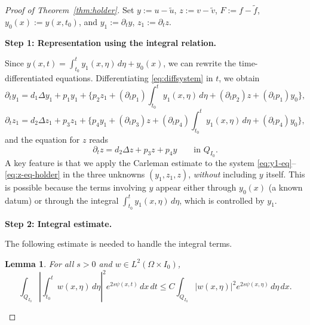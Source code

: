 \documentclass[12pt]{amsart}
\theoremstyle{plain}
\newtheorem{lemma}{Lemma}[section]
\theoremstyle{definition}
\theoremstyle{remark}
\newcommand{\p}{\partial}
\newcommand{\Om}{\Omega}
\newcommand{\Lap}{\Delta}
\begin{document}
\begin{proof}[Proof of Theorem~\ref{thm:holder}]
Set $y:=u-\widetilde u$, $z:=v-\widetilde v$, $F:=f-\widetilde f$,
$y_0(x):=y(x,t_0)$, and $y_1:=\p_t y$, $z_1:=\p_t z$.

\medskip
\noindent\textbf{Step 1: Representation using the integral relation.}

Since $y(x,t)=\int_{t_0}^t y_1(x,\eta)\,d\eta+y_0(x)$, we can rewrite
the time-differentiated equations.
Differentiating \eqref{eq:diffsystem} in $t$, we obtain
\begin{equation}\label{eq:y1-eq}
\p_t y_1=d_1\Lap y_1+p_1 y_1
+\biggl\{p_2 z_1+(\p_t p_1)\int_{t_0}^t y_1(x,\eta)\,d\eta
+(\p_t p_2)z+(\p_t p_1)y_0\biggr\},
\end{equation}
\begin{equation}\label{eq:z1-eq}
\p_t z_1=d_2\Lap z_1+p_3 z_1
+\biggl\{p_4 y_1+(\p_t p_3)z
+(\p_t p_4)\int_{t_0}^t y_1(x,\eta)\,d\eta+(\p_t p_4)y_0\biggr\},
\end{equation}
and the equation for $z$ reads
\begin{equation}\label{eq:z-eq-holder}
\p_t z=d_2\Lap z+p_3 z+p_4 y\qquad\text{in }Q_{I_0}.
\end{equation}
A key feature is that we apply the Carleman estimate to the system
\eqref{eq:y1-eq}--\eqref{eq:z-eq-holder} in the three unknowns
$(y_1,z_1,z)$, \emph{without} including $y$ itself.
This is possible because the terms involving $y$ appear either through
$y_0(x)$ (a known datum) or through the integral
$\int_{t_0}^t y_1(x,\eta)\,d\eta$, which is controlled by $y_1$.

\medskip
\noindent\textbf{Step 2: Integral estimate.}

The following estimate is needed to handle the integral terms.

\begin{lemma}\label{lem:integral}
For all $s>0$ and $w\in L^2(\Om\times I_0)$,
\[
\int_{Q_{I_0}}\left|\int_{t_0}^t w(x,\eta)\,d\eta\right|^2
e^{2s\psi(x,t)}\,dx\,dt
\le C\int_{Q_{I_0}}|w(x,\eta)|^2 e^{2s\psi(x,\eta)}\,d\eta\,dx.
\]
\end{lemma}


\end{proof}
\end{document}
